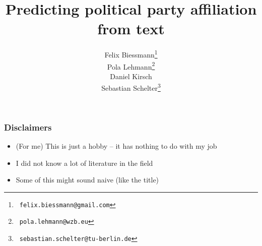 \documentclass[]{beamer}
\institute[]{}
\title[]{
{
Predicting political party affiliation from text
}}
\author{
Felix Biessmann\thanks{~\tt felix.biessmann@gmail.com}\\
 Pola Lehmann\thanks{ ~{\tt pola.lehmann@wzb.eu} }\\
Daniel Kirsch\\
  Sebastian Schelter\thanks{~\tt sebastian.schelter@tu-berlin.de}\\
}
\begin{document}
\begin{frame} 
\titlepage 
\end{frame}	

%

\begin{frame}\frametitle{Disclaimers}
\small
\begin{itemize}[<+->]
\item (For me) This is just a hobby -- it has nothing to do with my job
\item I did not know a lot of literature in the field 
\item Some of this might sound naive (like the title)
\end{itemize}
\end{frame}


\end{document}
